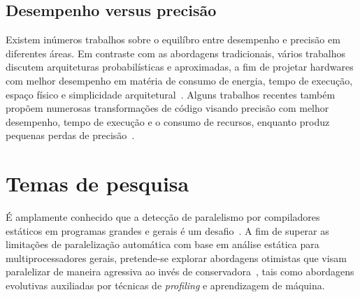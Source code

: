 \documentclass[a4paper,12pt]{article}
\newcommand\FIXME[1]{\textcolor{red}{FIX:}\textcolor{red}{#1}}
\begin{document}
\subsection{Desempenho versus precisão}
\label{subsec:perfvsacc}

Existem inúmeros trabalhos sobre o equilíbro entre desempenho e precisão em diferentes áreas. Em contraste com as abordagens tradicionais, vários trabalhos discutem arquiteturas probabilísticas e aproximadas, a fim de projetar hardwares com melhor desempenho em matéria de consumo de energia, tempo de execução, espaço físico e simplicidade arquitetural~\cite{palem09,palem12,lingamneni12,kirsch12}. Alguns trabalhos recentes também propõem numerosas transformações de código visando precisão com melhor desempenho, tempo de execução e o consumo de recursos, enquanto produz pequenas perdas de precisão~\cite{misailovic11,douskos11,zhu12}.


\section{Temas de pesquisa}\label{sec:research-dir}


É amplamente conhecido que a detecção de paralelismo por compiladores estáticos em programas grandes e gerais é um desafio~\cite{kennedy01,chen03}. A fim de superar as limitações de paralelização automática com base em análise estática para multiprocessadores gerais, pretende-se explorar abordagens otimistas que visam paralelizar de maneira agressiva ao invés de conservadora~\cite{chen03,williams96,williams99}, tais como abordagens evolutivas auxiliadas por técnicas de \textit{profiling} e aprendizagem de máquina.

\end{document}
